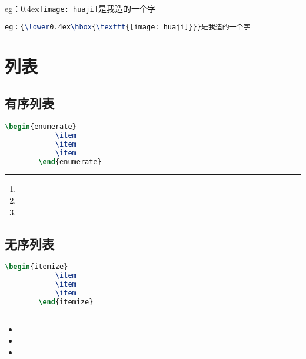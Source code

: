 eg：{\lower0.4ex\hbox{\texttt{[image: huaji]}}}是我造的一个字
\begin{lstlisting}[language=TeX]
eg：{\lower0.4ex\hbox{\texttt{[image: huaji]}}}是我造的一个字
\end{lstlisting}

\section{列表}


\subsection{有序列表}
\begin{minipage}[t]{0.48\textwidth}
	\begin{lstlisting}[language=TeX]
		\begin{enumerate}
			\item 
			\item 
			\item 
		\end{enumerate}
	\end{lstlisting} 
\end{minipage}
\begin{minipage}[t]{0.48\textwidth}
	\rule[-10pt]{10cm}{0em}
	\begin{enumerate}
		\item 
		\item 
		\item 
	\end{enumerate}
\end{minipage}
\subsection{无序列表}
\begin{minipage}[t]{0.48\textwidth}
	\begin{lstlisting}[language=TeX]
		\begin{itemize}
			\item 
			\item 
			\item 
		\end{itemize}
	\end{lstlisting} 
\end{minipage}
\begin{minipage}[t]{0.48\textwidth}
	\rule[-10pt]{10cm}{0em}
	\begin{itemize}
		\item 
		\item 
		\item 
	\end{itemize}
\end{minipage}

